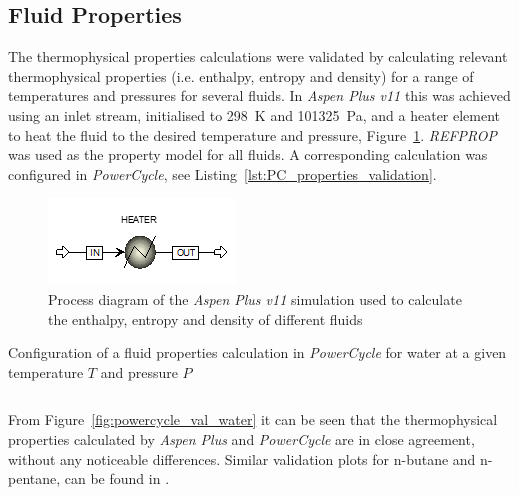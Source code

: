     \subsection{Fluid Properties}
        \label{sec:PC_props_validation}
        The thermophysical properties calculations were validated by calculating relevant thermophysical properties (i.e. enthalpy, entropy and density) for a range of temperatures and pressures for several fluids. In \emph{Aspen Plus v11} this was achieved using an inlet stream, initialised to \qty{298}{K} and \qty{101325}{\Pa}, and a heater element to heat the fluid to the desired temperature and pressure, Figure~\ref{fig:Aspen_properties_validation}. \emph{REFPROP} was used as the property model for all fluids. A corresponding calculation was configured in \emph{PowerCycle}, see Listing~\ref{lst:PC_properties_validation}.

        \begin{figure}[H]
            \centering
            \includegraphics{Content/PowerCycle/Figures/AspenPlus_FluidPropertiesValidation.png}
            \caption{Process diagram of the \emph{Aspen Plus v11} simulation used to calculate the enthalpy, entropy and density of different fluids}
            \label{fig:Aspen_properties_validation}
        \end{figure}

        \begin{listing}[H]
            \caption{Configuration of a fluid properties calculation in \emph{PowerCycle} for water at a given temperature \(T\) and pressure \(P\)}
            \inputminted[bgcolor=bg,linenos, fontsize=\footnotesize]{python}{Content/PowerCycle/Code/FluidPropertiesComparison_snippet.py}
            \label{lst:PC_properties_validation}
            \vspace{-20pt}
        \end{listing}

        From Figure~\ref{fig:powercycle_val_water} it can be seen that the thermophysical properties calculated by \emph{Aspen Plus} and \emph{PowerCycle} are in close agreement, without any noticeable differences. Similar validation plots for n-butane and n-pentane, can be found in .   
        
